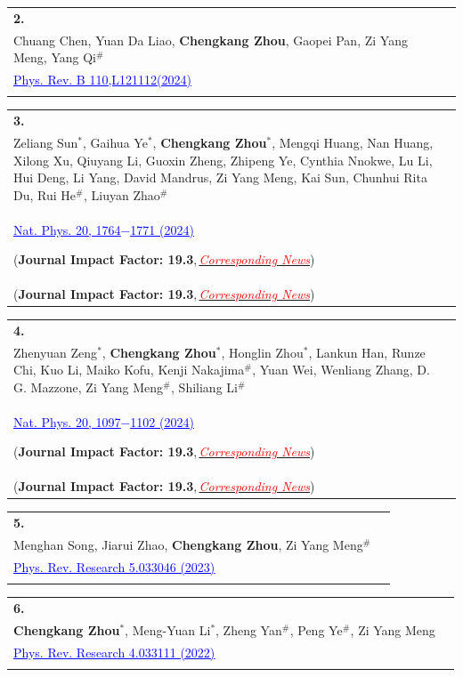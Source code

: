 \documentclass[letterpaper,11pt]{article}
\makeatletter
\newcommand{\cvpublish}[5]{
  \vspace{-5pt}\item
    \begin{tabularx}{\textwidth}[t]{@{}p{0.025\textwidth}@{\hspace{0.01\textwidth}}X@{}}
      \textbf{#1.} & 
      \begin{minipage}[t]{\hsize}
        \textbf{#2} \\
        #3 \\
        \small #4
        \ifx#5\empty\else
          \\
          \small #5
        \fi
      \end{minipage} \\
    \end{tabularx}\vspace{-2.5pt}
}
\makeatother
\begin{document}
    \cvpublish
      {2}{Universal collective Larmor-Silin mode emerging in magnetized correlated Dirac fermions}
      {Chuang Chen, Yuan Da Liao, \textbf{Chengkang Zhou}, Gaopei Pan, Zi Yang Meng, Yang Qi$^\#$}
      {\href{https://journals.aps.org/prb/abstract/10.1103/PhysRevB.110.L121112}{\textcolor{blue}{\underline{Phys. Rev. B 110,L121112(2024)}}}}
      {}

    \cvpublish
      {3}{Dimensionality crossover to a two-dimensional vestigial nematic state from a three-dimensional antiferromagnet in a honeycomb van der Waals magnet}
      {Zeliang Sun$^*$, Gaihua Ye$^*$, \textbf{Chengkang Zhou$^*$}, Mengqi Huang, Nan Huang, Xilong Xu, Qiuyang Li, Guoxin Zheng, Zhipeng Ye, Cynthia Nnokwe, Lu Li, Hui Deng, Li Yang, David Mandrus, Zi Yang Meng, Kai Sun, Chunhui Rita Du, Rui He$^\#$, Liuyan Zhao$^\#$}
      {
        \href{https://www.nature.com/articles/s41567-024-02618-6}{\textcolor{blue}{\underline{Nat. Phys. 20, 1764$-$1771 (2024)}}}
        }
      {(\textbf{Journal Impact Factor: 19.3},\,\href{https://hku.hk/press/news_detail_27648.html}{\textcolor{red}{\textit{Corresponding News}}})}

    \cvpublish
      {4}{Spectral evidence for Dirac spinons in a kagome lattice antiferromagnet}
      {Zhenyuan Zeng$^*$, \textbf{Chengkang Zhou$^*$}, Honglin Zhou$^*$, Lankun Han, Runze Chi, Kuo Li, Maiko Kofu, Kenji Nakajima$^\#$, Yuan Wei, Wenliang Zhang, D. G. Mazzone, Zi Yang Meng$^\#$, Shiliang Li$^\#$}
      {
        \href{https://doi.org/10.1038/s41567-024-02495-z}{\textcolor{blue}{\underline{Nat. Phys. 20, 1097$-$1102 (2024)}}}
        }
      {(\textbf{Journal Impact Factor: 19.3},\,\href{https://www.hku.hk/press/press-releases/detail/27305.html}{\textcolor{red}{\textit{Corresponding News}}})}

    \cvpublish
      {5}{Dynamical properties of quantum many-body systems with long range interactions}
      {Menghan Song, Jiarui Zhao, \textbf{Chengkang Zhou}, Zi Yang Meng$^\#$}
      {
        \href{https://journals.aps.org/prresearch/abstract/10.1103/PhysRevResearch.5.033046}{\textcolor{blue}{\underline{Phys. Rev. Research 5.033046 (2023)}}}
        }
      {}

    \cvpublish
      {6}{Evolution of Dynamical Signature in the X-cube Fracton Topological Order}
      {\textbf{Chengkang Zhou$^*$}, Meng-Yuan Li$^*$, Zheng Yan$^\#$, Peng Ye$^\#$, Zi Yang Meng}
      {
        \href{https://doi.org/10.1103/PhysRevResearch.4.033111}{\textcolor{blue}{\underline{Phys. Rev. Research 4.033111 (2022)}}}
        }
      {}
\end{document}
